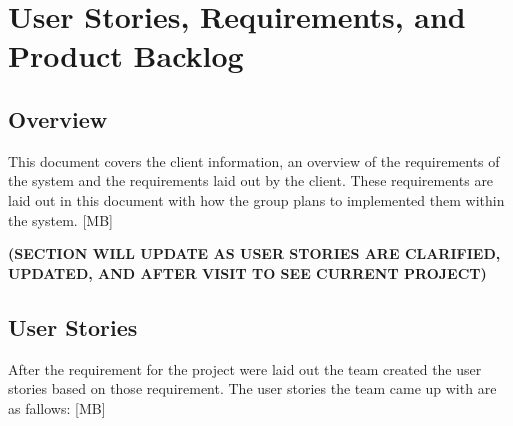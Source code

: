 
\chapter{User Stories,  Requirements, and Product Backlog}
\section{Overview}


This document covers the client information, an overview of the requirements of the system and the requirements laid out by the client. These requirements are laid out in this document with how the group plans to implemented them within the system. [MB]

\bf(SECTION WILL UPDATE AS USER STORIES ARE CLARIFIED, UPDATED, AND AFTER VISIT TO SEE CURRENT PROJECT) 



\section{User Stories}
After the requirement for the project were laid out the team created the user stories based on those requirement. The user stories the team came up with are as fallows: [MB]

